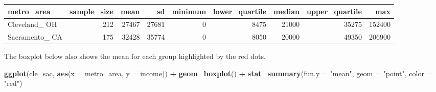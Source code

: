 \documentclass[12pt, krantz2,]{krantz}
\makeatletter
\newenvironment{Shaded}{\begin{snugshade}}{\end{snugshade}}
\newcommand{\DataTypeTok}[1]{\textcolor[rgb]{0.27,0.27,0.27}{#1}}
\newcommand{\DecValTok}[1]{\textcolor[rgb]{0.06,0.06,0.06}{#1}}
\newcommand{\FloatTok}[1]{\textcolor[rgb]{0.06,0.06,0.06}{#1}}
\newcommand{\KeywordTok}[1]{\textcolor[rgb]{0.27,0.27,0.27}{\textbf{#1}}}
\newcommand{\NormalTok}[1]{#1}
\newcommand{\OperatorTok}[1]{\textcolor[rgb]{0.43,0.43,0.43}{\textbf{#1}}}
\newcommand{\StringTok}[1]{\textcolor[rgb]{0.5,0.5,0.5}{#1}}
\newenvironment{kframe}{%
\medskip{}
\setlength{\fboxsep}{.8em}
 \def\at@end@of@kframe{}%
 \ifinner\ifhmode%
  \def\at@end@of@kframe{\end{minipage}}%
  \begin{minipage}{\columnwidth}%
 \fi\fi%
 \def\FrameCommand##1{\hskip\@totalleftmargin \hskip-\fboxsep
 \colorbox{shadecolor}{##1}\hskip-\fboxsep
     \hskip-\linewidth \hskip-\@totalleftmargin \hskip\columnwidth}%
 \MakeFramed {\advance\hsize-\width
   \@totalleftmargin\z@ \linewidth\hsize
   \@setminipage}}%
 {\par\unskip\endMakeFramed%
 \at@end@of@kframe}
\renewenvironment{Shaded}{\begin{kframe}}{\end{kframe}}
\makeatother
\begin{document}
\begin{Shaded}
\end{Shaded}

\begin{table}[H]
\centering\begingroup\fontsize{10}{12}\selectfont

\begin{tabular}{l|r|r|r|r|r|r|r|r}
\hline
metro\_area & sample\_size & mean & sd & minimum & lower\_quartile & median & upper\_quartile & max\\
\hline
Cleveland\_ OH & 212 & 27467 & 27681 & 0 & 8475 & 21000 & 35275 & 152400\\
\hline
Sacramento\_ CA & 175 & 32428 & 35774 & 0 & 8050 & 20000 & 49350 & 206900\\
\hline
\end{tabular}
\endgroup{}
\end{table}

The boxplot below also shows the mean for each group highlighted by the red dots.

\begin{Shaded}
\begin{Highlighting}[]
\KeywordTok{ggplot}\NormalTok{(cle_sac, }\KeywordTok{aes}\NormalTok{(}\DataTypeTok{x =}\NormalTok{ metro_area, }\DataTypeTok{y =}\NormalTok{ income)) }\OperatorTok{+}
\StringTok{  }\KeywordTok{geom_boxplot}\NormalTok{() }\OperatorTok{+}
\StringTok{  }\KeywordTok{stat_summary}\NormalTok{(}\DataTypeTok{fun.y =} \StringTok{"mean"}\NormalTok{, }\DataTypeTok{geom =} \StringTok{"point"}\NormalTok{, }\DataTypeTok{color =} \StringTok{"red"}\NormalTok{)}
\end{Highlighting}
\end{Shaded}
\end{document}
